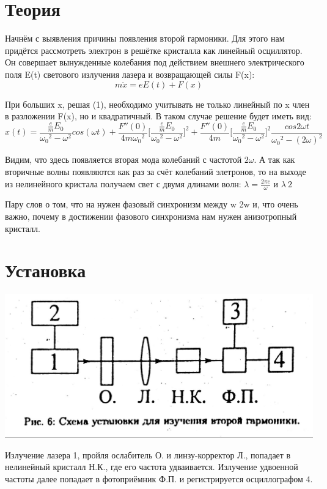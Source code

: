 \documentclass[a4paper,14pt]{article} %
\begin{document}


\newpage

\section{Теория}
Начнём с выявления причины появления второй гармоники. Для этого нам придётся рассмотреть электрон в решётке кристалла как линейный осциллятор. Он совершает вынужденные колебания под действием внешнего электрического поля E(t) светового излучения лазера и возвращающей силы F(x):\\
\begin{equation}
m \ddot{x} = e E(t) + F(x)
\end{equation}

При больших x, решая (1), необходимо учитывать не только линейный по x член в разложении F(x), но и квадратичный. В таком случае решение будет иметь вид:
\begin{equation}
x(t) = \frac{\frac{e}{m} E_0}{{\omega_0}^2 - {\omega}^2} cos(\omega t) 
+ \frac{F''(0)}{4m {\omega_0}^2} \Big[\frac{\frac{e}{m} E_0}{{\omega_0}^2 - {\omega}^2}\Big]^2
+ \frac{F''(0)}{4m} \Big[\frac{\frac{e}{m} E_0}{{\omega_0}^2 - {\omega}^2}\Big]^2
\frac{cos2\omega t}{{\omega_0}^2 - (2 \omega)^2}
\end{equation}

Видим, что здесь появляется вторая мода колебаний с частотой $2 \omega$. А так как вторичные волны появляются как раз за счёт колебаний элетронов, то на выходе из нелинейного кристала получаем свет с двумя длинами волн: $\lambda = \frac{2 \pi c}{\omega}$ и $\lambda \ 2$

Пару слов о том, что на нужен фазовый синхронизм между w  2w и, что очень важно, почему в достижении фазового синхронизма нам нужен анизотропный кристалл.

\section{Установка}
\begin{center}
\includegraphics[width = 0.5 \textwidth]{images/setup.jpg}
\end{center}
Излучение лазера 1, пройля ослабитель О. и линзу-корректор Л., попадает в нелинейный кристалл Н.К., где его частота удваивается. Излучение удвоенной частоты далее попадает в фотоприёмник Ф.П. и регистрируется осциллографом 4.
\end{document}
